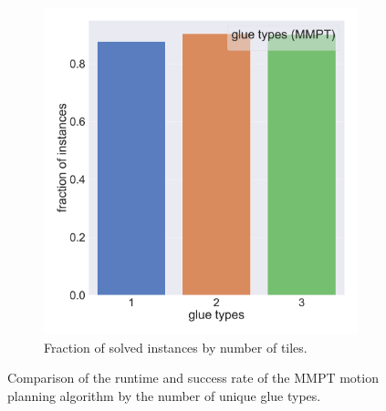 \begin{figure}[htpb]
\begin{subfigure}[b]{0.48\textwidth}
\includegraphics[width=\textwidth]{figures/plots/heuristic_solvers_i1/mmpt_i1_fraction_solved_over_glue_types.pdf}
\caption{Fraction of solved instances by number of tiles.}
\label{fig:mmpt_i1_fraction_solved_over_glue_types}
\end{subfigure}
\caption[Runtime and success rate of MMPT by number of glue types] {Comparison of the runtime and success rate of the MMPT motion planning algorithm by the number of unique glue types.}
\label{fig:mmpt_i1_glue_types}
\end{figure}

